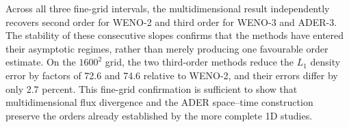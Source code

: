 Across all three fine-grid intervals, the multidimensional result independently
recovers second order for WENO-2 and third order for WENO-3 and ADER-3. The
stability of these consecutive slopes confirms that the methods have entered
their asymptotic regimes, rather than merely producing one favourable order
estimate. On the \(1600^2\) grid, the two
third-order methods reduce the \(L_1\) density error by factors of 72.6 and
74.6 relative to WENO-2, and their errors differ by only 2.7 percent. This
fine-grid confirmation is sufficient to show that multidimensional flux
divergence and the ADER space--time construction preserve the orders already
established by the more complete 1D studies.
